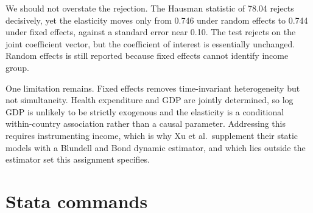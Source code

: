 \documentclass[11pt,a4paper]{article}
\begin{document}
We should not overstate the rejection. The Hausman statistic of 78.04 rejects
decisively, yet the elasticity moves only from 0.746 under random effects to
0.744 under fixed effects, against a standard error near 0.10. The test rejects
on the joint coefficient vector, but the coefficient of interest is essentially
unchanged. Random effects is still reported because fixed effects cannot
identify income group.

One limitation remains. Fixed effects removes time-invariant heterogeneity but
not simultaneity. Health expenditure and GDP are jointly determined, so log GDP
is unlikely to be strictly exogenous and the elasticity is a conditional
within-country association rather than a causal parameter. Addressing this
requires instrumenting income, which is why Xu et al.\ supplement their static
models with a Blundell and Bond dynamic estimator, and which lies outside the
estimator set this assignment specifies.

\clearpage
\appendix
\section{Stata commands}
\end{document}

